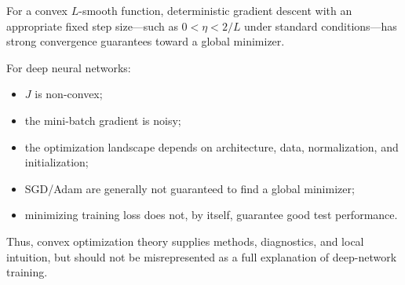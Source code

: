\documentclass[11pt,a4paper]{article}
\theoremstyle{definition}
\begin{document}
For a convex $L$-smooth function, deterministic gradient descent with an appropriate fixed step size—such as $0 < \eta < 2/L$ under standard conditions—has strong convergence guarantees toward a global minimizer.

For deep neural networks:
\begin{itemize}
    \item $J$ is non-convex;
    \item the mini-batch gradient is noisy;
    \item the optimization landscape depends on architecture, data, normalization, and initialization;
    \item SGD/Adam are generally not guaranteed to find a global minimizer;
    \item minimizing training loss does not, by itself, guarantee good test performance.
\end{itemize}

Thus, convex optimization theory supplies methods, diagnostics, and local intuition, but should not be misrepresented as a full explanation of deep-network training.
\end{document}

